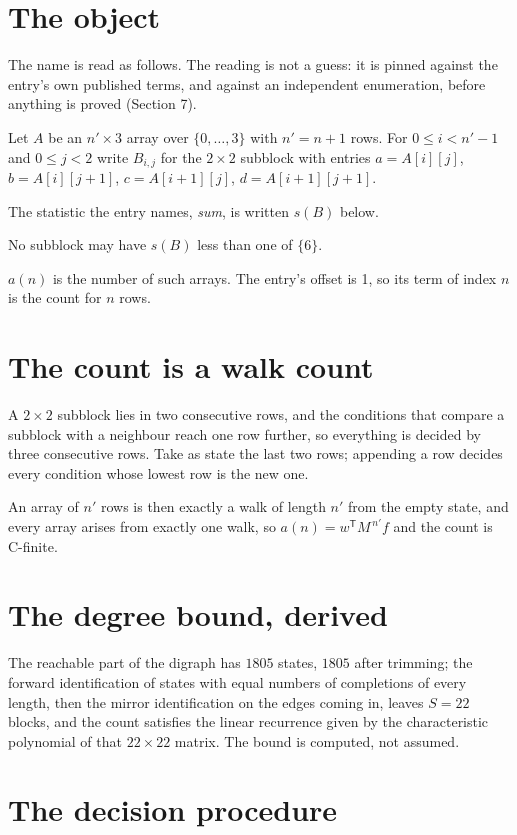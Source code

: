 \documentclass[11pt]{article}
\theoremstyle{definition}
\begin{document}
\section{The object}

The name is read as follows. The reading is not a guess: it is pinned against the entry's own published terms, and against an independent enumeration, before anything is proved (Section 7).

Let $A$ be an $n' \times 3$ array over $\{0,\dots,3\}$ with $n' = n + 1$ rows. For $0 \le i < n'-1$ and $0 \le j < 2$ write $B_{i,j}$ for the $2\times2$ subblock with entries $a = A[i][j]$, $b = A[i][j{+}1]$, $c = A[i{+}1][j]$, $d = A[i{+}1][j{+}1]$.

The statistic the entry names, {\itshape sum}, is written $s(B)$ below.

No subblock may have $s(B)$ less than one of $\{6\}$.

$a(n)$ is the number of such arrays. The entry's offset is 1, so its term of index $n$ is the count for $n$ rows.

\section{The count is a walk count}

A $2\times2$ subblock lies in two consecutive rows, and the conditions that compare a subblock with a neighbour reach one row further, so everything is decided by three consecutive rows. Take as state the last two rows; appending a row decides every condition whose lowest row is the new one.

An array of $n'$ rows is then exactly a walk of length $n'$ from the empty state, and every array arises from exactly one walk, so $a(n) = w^{\mathsf T}M^{\,n'}f$ and the count is C-finite.

\section{The degree bound, derived}

The reachable part of the digraph has $1805$ states, $1805$ after trimming; the forward identification of states with equal numbers of completions of every length, then the mirror identification on the edges coming in, leaves $S = 22$ blocks, and the count satisfies the linear recurrence given by the characteristic polynomial of that $22\times22$ matrix. The bound is computed, not assumed.

\section{The decision procedure}
\end{document}
